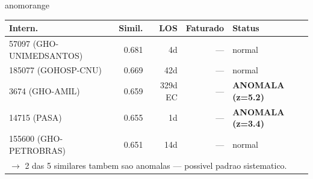 \documentclass[a4paper,10pt]{article}
\begin{document}
\begin{anomalycard}[Internacao 3645 | GHO-AMIL | ALTO (z=4.43)]{anomorange}
\begin{tabular}{l r r r l}\toprule\textbf{Intern.} & \textbf{Simil.} & \textbf{LOS} & \textbf{Faturado} & \textbf{Status} \\\midrule
57097 (GHO-UNIMEDSANTOS) & 0.681 & 4d & --- & \textcolor{jcubeblue}{normal} \\
185077 (GOHOSP-CNU) & 0.669 & 42d & --- & \textcolor{jcubeblue}{normal} \\
3674 (GHO-AMIL) & 0.659 & 329d EC & --- & \textcolor{anomred}{\textbf{ANOMALA (z=5.2)}} \\
14715 (PASA) & 0.655 & 1d & --- & \textcolor{anomred}{\textbf{ANOMALA (z=3.4)}} \\
155600 (GHO-PETROBRAS) & 0.651 & 14d & --- & \textcolor{jcubeblue}{normal} \\
\multicolumn{5}{l}{\textcolor{anomred}{\small $\rightarrow$ 2 das 5 similares tambem sao anomalas --- possivel padrao sistematico.}} \\
\bottomrule\end{tabular}


\end{anomalycard}

\newpage
\end{document}
